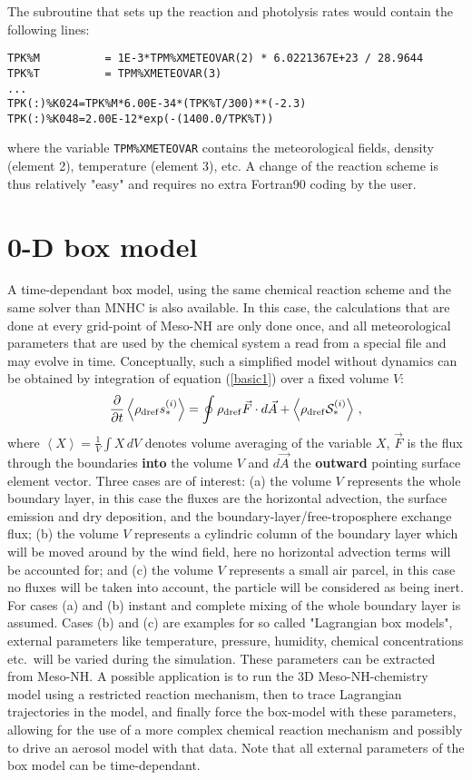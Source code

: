 The subroutine that sets up the reaction and photolysis rates would
contain the following lines:
{\small
\begin{verbatim}
TPK%M          = 1E-3*TPM%XMETEOVAR(2) * 6.0221367E+23 / 28.9644
TPK%T          = TPM%XMETEOVAR(3)
...
TPK(:)%K024=TPK%M*6.00E-34*(TPK%T/300)**(-2.3)
TPK(:)%K048=2.00E-12*exp(-(1400.0/TPK%T))
\end{verbatim}
}
where the variable {\tt TPM\%XMETEOVAR} contains the
meteorological fields, density (element 2), temperature (element 3), etc.
A change of the reaction scheme is thus relatively "easy" and requires
no extra Fortran90 coding by the user.
\section{0-D box model}
%
A time-dependant box model, using the same chemical reaction scheme
and the same solver than MNHC is also available.
In this case, the calculations that are done at every grid-point
of Meso-NH are only done once, and all meteorological parameters
that are used by the chemical system a read from a special file
and may evolve in time.
Conceptually, such a simplified model without dynamics can be obtained by
integration of equation (\ref{basic1}) over a fixed volume $V$:
\begin{equation}
\frac{\partial}{\partial t} \left<\rho_{\rm dref}{s}_\ast^{(i)}\right> =  \oint \rho_{\rm dref}\vec F \cdot d\vec A
+ \left< \rho_{\rm dref} {\cal S}_\ast^{(i)} \right>
\,,
\end{equation}
%
where $ \left< X \right> = \frac1V \int X \, dV $ denotes volume averaging 
of the variable $X$, $\vec F$ is the flux through the boundaries {\bf into} the
volume $V$ and $d\vec A$ the {\bf outward} pointing surface element vector.
Three cases are of interest: 
(a) the volume $V$ represents the whole
boundary layer, in this case the fluxes are the horizontal advection,
the surface emission and dry deposition, and the boundary-layer/free-troposphere
exchange flux;
(b) the volume $V$ represents a cylindric column of the boundary layer
which will be moved around by the wind field, here no horizontal advection terms
will be accounted for; and 
(c) the volume $V$ represents a small air parcel, in this case no
fluxes will be taken into account, the particle will be considered
as being inert.
For cases (a) and (b) instant and complete mixing of the whole boundary
layer is assumed. Cases (b) and (c) are examples for
so called "Lagrangian box models", external parameters like temperature,
pressure, humidity, chemical concentrations etc.\ will be 
varied during the simulation.
These parameters can be extracted from Meso-NH.
A possible application is to run the 3D Meso-NH-chemistry model using
a restricted reaction mechanism, then to trace Lagrangian trajectories in the
model, and finally force the box-model with these parameters, allowing 
for the use of 
a more complex chemical reaction mechanism and possibly to drive an aerosol
model with that data.
Note that all external parameters of the box model can be time-dependant.

